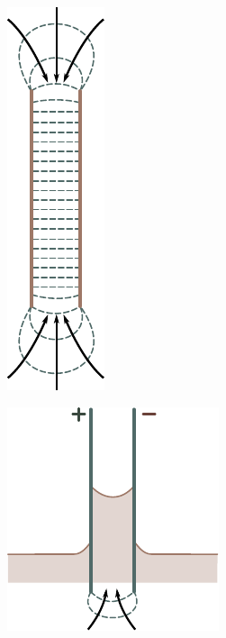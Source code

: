 \begin{figure}[t]
	\begin{minipage}[t]{0.48\linewidth}
		\begin{center}
			\includegraphics[scale=1]{figures/ch_04/fig_4_2.pdf}
			\caption[]{}
			\label{fig:4_2}
		\end{center}
	\end{minipage}
	\hfill{ }%
	\begin{minipage}[t]{0.48\linewidth}
		\begin{center}
			\includegraphics[scale=1]{figures/ch_04/fig_4_3.pdf}
			\caption[]{}
			\label{fig:4_3}
		\end{center}
	\end{minipage}
\vspace{-0.4cm}
\end{figure}

